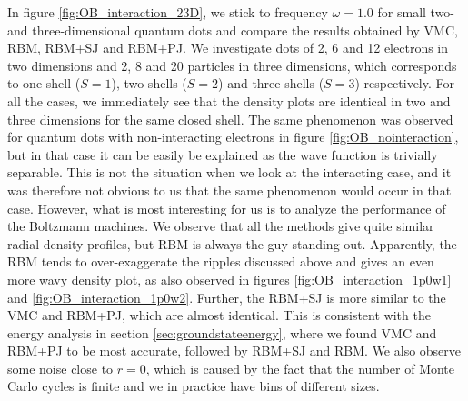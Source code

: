 In figure \eqref{fig:OB_interaction_23D}, we stick to frequency $\omega=1.0$ for small two- and three-dimensional quantum dots and compare the results obtained by VMC, RBM, RBM+SJ and RBM+PJ. We investigate dots of 2, 6 and 12 electrons in two dimensions and 2, 8 and 20 particles in three dimensions, which corresponds to one shell ($S=1$), two shells ($S=2$) and three shells ($S=3$) respectively. For all the cases, we immediately see that the density plots are identical in two and three dimensions for the same closed shell. The same phenomenon was observed for quantum dots with non-interacting electrons in figure \eqref{fig:OB_nointeraction}, but in that case it can be easily be explained as the wave function is trivially separable. This is not the situation when we look at the interacting case, and it was therefore not obvious to us that the same phenomenon would occur in that case. However, what is most interesting for us is to analyze the performance of the Boltzmann machines. We observe that all the methods give quite similar radial density profiles, but RBM is always the guy standing out. Apparently, the RBM tends to over-exaggerate the ripples discussed above and gives an even more wavy density plot, as also observed in figures \eqref{fig:OB_interaction_1p0w1} and \eqref{fig:OB_interaction_1p0w2}. Further, the RBM+SJ is more similar to the VMC and RBM+PJ, which are almost identical. This is consistent with the energy analysis in section \ref{sec:groundstateenergy}, where we found VMC and RBM+PJ to be most accurate, followed by RBM+SJ and RBM. We also observe some noise close to $r=0$, which is caused by the fact that the number of Monte Carlo cycles is finite and we in practice have bins of different sizes.

